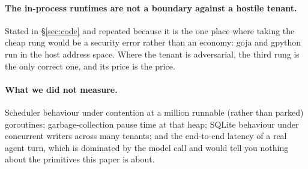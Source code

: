 \paragraph{The in-process runtimes are not a boundary against a hostile tenant.}
Stated in \S\ref{sec:code} and repeated because it is the one place where taking
the cheap rung would be a security error rather than an economy: goja and
gpython run in the host address space. Where the tenant is adversarial, the third
rung is the only correct one, and its price is the price.

\paragraph{What we did not measure.}
Scheduler behaviour under contention at a million runnable (rather than parked)
goroutines; garbage-collection pause time at that heap; SQLite behaviour under
concurrent writers across many tenants; and the end-to-end latency of a real
agent turn, which is dominated by the model call and would tell you nothing about
the primitives this paper is about.
